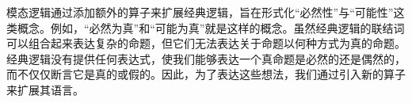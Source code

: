 \documentclass[../../../include/open-logic-chapter]{subfiles}
\begin{document}

模态逻辑通过添加额外的算子来扩展经典逻辑，旨在形式化“必然性”与“可能性”这类概念。例如，“必然为真”和“可能为真”就是这样的概念。虽然经典逻辑的联结词可以组合起来表达复杂的命题，但它们无法表达关于命题以何种方式为真的命题。经典逻辑没有提供任何表达式，使我们能够表达一个真命题是必然的还是偶然的，而不仅仅断言它是真的或假的。因此，为了表达这些想法，我们通过引入新的算子来扩展其语言。


\OLEndChapterHook
\end{document}
